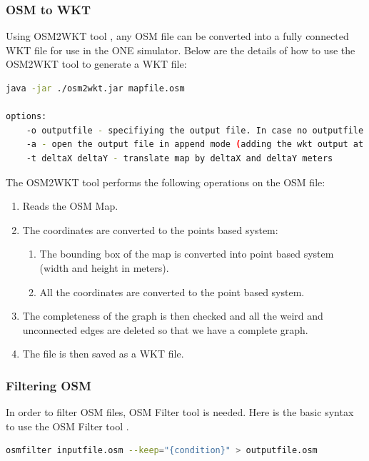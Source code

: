 \subsubsection{OSM to WKT}
Using OSM2WKT tool \cite{mayer2010osm}, any OSM file can be converted into a fully connected WKT file for use in the ONE simulator. Below are the details of how to use the OSM2WKT tool \cite{mayer2010osm} to generate a WKT file:\newline

\begin{lstlisting}[language=bash]
java -jar ./osm2wkt.jar mapfile.osm

options:
	-o outputfile - specifiying the output file. In case no outputfile is mentioned, .wkt is appended to the name of input file.
	-a - open the output file in append mode (adding the wkt output at the end of the output file)
	-t deltaX deltaY - translate map by deltaX and deltaY meters
\end{lstlisting}

\vspace{8mm}
The OSM2WKT tool \cite{mayer2010osm} performs the following operations on the OSM file:
	\begin{enumerate}
 	 \item Reads the OSM Map.
   	 \item The coordinates are converted to the points based system:
   	 	\begin{enumerate}
	   	 	\item The bounding box of the map is converted into point based system (width and height in meters).
   		 	\item All the coordinates are converted to the point based system.
   		 \end{enumerate}
   	 \item The completeness of the graph is then checked and all the weird and unconnected edges are deleted so that we have a complete graph.
   	 \item The file is then saved as a WKT file.
	\end{enumerate}

\newpage
\subsubsection{Filtering OSM}
In order to filter OSM files, OSM Filter tool \cite{osm-filter} is needed. Here is the basic syntax to use the OSM Filter tool \cite{osm-filter}.
\vspace{2mm}
\begin{lstlisting}[language=bash]
	osmfilter inputfile.osm --keep="{condition}" > outputfile.osm	
\end{lstlisting}
\vspace{5mm}	

